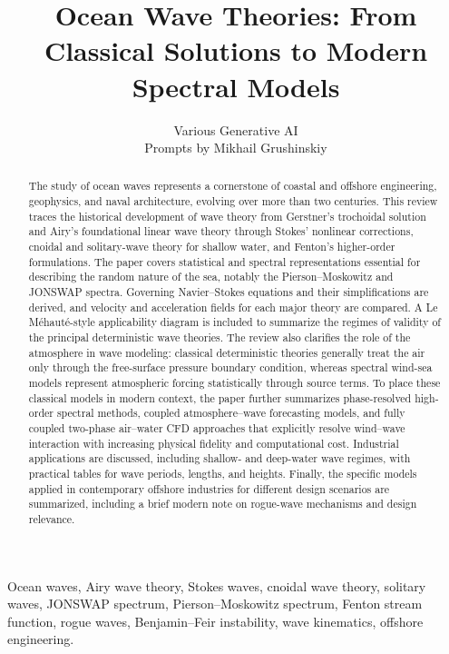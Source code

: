 \documentclass[journal,10pt,twocolumn]{IEEEtran}
\title{Ocean Wave Theories: From Classical Solutions to Modern Spectral Models}
\author{Various Generative AI\\Prompts by Mikhail Grushinskiy}
\begin{document}
\maketitle

\begin{abstract}
The study of ocean waves represents a cornerstone of coastal and offshore engineering,
geophysics, and naval architecture, evolving over more than two centuries.
This review traces the historical development of wave theory from Gerstner's trochoidal
solution and Airy's foundational linear wave theory through Stokes' nonlinear corrections,
cnoidal and solitary-wave theory for shallow water, and Fenton's higher-order formulations.
The paper covers statistical and spectral representations essential for describing the
random nature of the sea, notably the Pierson--Moskowitz and JONSWAP spectra.
Governing Navier--Stokes equations and their simplifications are derived, and velocity
and acceleration fields for each major theory are compared.
A Le M\'ehaut\'e-style applicability diagram is included to summarize the regimes of
validity of the principal deterministic wave theories.
The review also clarifies the role of the atmosphere in wave modeling: classical
deterministic theories generally treat the air only through the free-surface pressure
boundary condition, whereas spectral wind-sea models represent atmospheric forcing
statistically through source terms.
To place these classical models in modern context, the paper further summarizes
phase-resolved high-order spectral methods, coupled atmosphere--wave forecasting models,
and fully coupled two-phase air--water CFD approaches that explicitly resolve wind--wave
interaction with increasing physical fidelity and computational cost.
Industrial applications are discussed, including shallow- and deep-water wave regimes,
with practical tables for wave periods, lengths, and heights.
Finally, the specific models applied in contemporary offshore industries for different
design scenarios are summarized, including a brief modern note on rogue-wave mechanisms
and design relevance.
\end{abstract}


\begin{IEEEkeywords}
Ocean waves, Airy wave theory, Stokes waves, cnoidal wave theory,
solitary waves, JONSWAP spectrum, Pierson--Moskowitz spectrum,
Fenton stream function, rogue waves, Benjamin--Feir instability,
wave kinematics, offshore engineering.
\end{IEEEkeywords}
\end{document}
